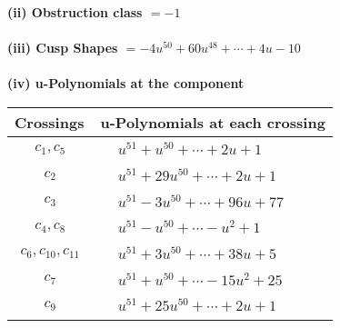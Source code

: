 \documentclass[1p]{elsarticle_modified}
\theoremstyle{definition}
\begin{document}
\flushleft \textbf{(ii) Obstruction class $= -1$}\\~\\
\flushleft \textbf{(iii) Cusp Shapes $= -4 u^{50}+60 u^{48}+\cdots+4 u-10$}\\~\\
\newpage\renewcommand{\arraystretch}{1}
\flushleft \textbf{(iv) u-Polynomials at the component}\newline \\
\begin{tabular}{m{50pt}|m{274pt}}
Crossings & \hspace{64pt}u-Polynomials at each crossing \\
\hline $$\begin{aligned}c_{1},c_{5}\end{aligned}$$&$\begin{aligned}
&u^{51}+u^{50}+\cdots+2 u+1
\end{aligned}$\\
\hline $$\begin{aligned}c_{2}\end{aligned}$$&$\begin{aligned}
&u^{51}+29 u^{50}+\cdots+2 u+1
\end{aligned}$\\
\hline $$\begin{aligned}c_{3}\end{aligned}$$&$\begin{aligned}
&u^{51}-3 u^{50}+\cdots+96 u+77
\end{aligned}$\\
\hline $$\begin{aligned}c_{4},c_{8}\end{aligned}$$&$\begin{aligned}
&u^{51}- u^{50}+\cdots- u^2+1
\end{aligned}$\\
\hline $$\begin{aligned}c_{6},c_{10},c_{11}\end{aligned}$$&$\begin{aligned}
&u^{51}+3 u^{50}+\cdots+38 u+5
\end{aligned}$\\
\hline $$\begin{aligned}c_{7}\end{aligned}$$&$\begin{aligned}
&u^{51}+u^{50}+\cdots-15 u^2+25
\end{aligned}$\\
\hline $$\begin{aligned}c_{9}\end{aligned}$$&$\begin{aligned}
&u^{51}+25 u^{50}+\cdots+2 u+1
\end{aligned}$\\
\hline
\end{tabular}\\~\\
\end{document}
